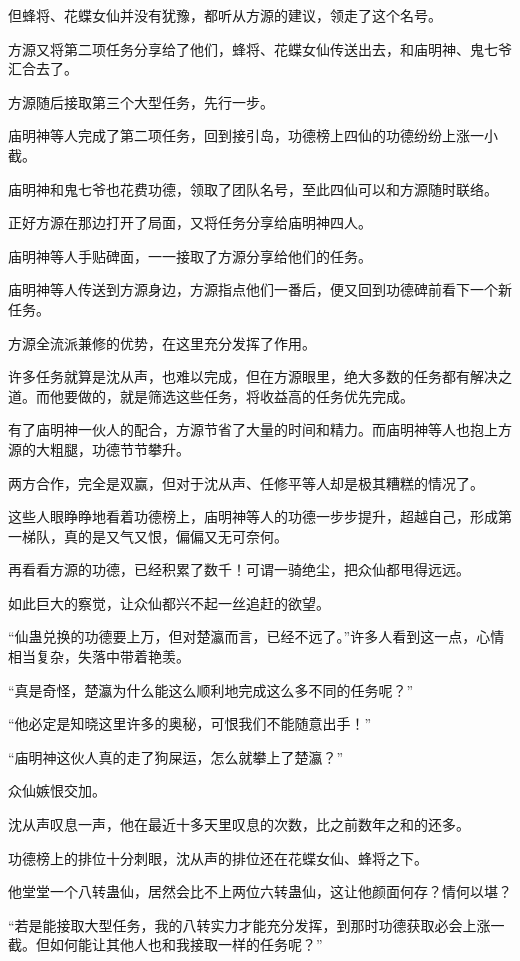 \begin{this_body}
但蜂将、花蝶女仙并没有犹豫，都听从方源的建议，领走了这个名号。

方源又将第二项任务分享给了他们，蜂将、花蝶女仙传送出去，和庙明神、鬼七爷汇合去了。

方源随后接取第三个大型任务，先行一步。

庙明神等人完成了第二项任务，回到接引岛，功德榜上四仙的功德纷纷上涨一小截。

庙明神和鬼七爷也花费功德，领取了团队名号，至此四仙可以和方源随时联络。

正好方源在那边打开了局面，又将任务分享给庙明神四人。

庙明神等人手贴碑面，一一接取了方源分享给他们的任务。

庙明神等人传送到方源身边，方源指点他们一番后，便又回到功德碑前看下一个新任务。

方源全流派兼修的优势，在这里充分发挥了作用。

许多任务就算是沈从声，也难以完成，但在方源眼里，绝大多数的任务都有解决之道。而他要做的，就是筛选这些任务，将收益高的任务优先完成。

有了庙明神一伙人的配合，方源节省了大量的时间和精力。而庙明神等人也抱上方源的大粗腿，功德节节攀升。

两方合作，完全是双赢，但对于沈从声、任修平等人却是极其糟糕的情况了。

这些人眼睁睁地看着功德榜上，庙明神等人的功德一步步提升，超越自己，形成第一梯队，真的是又气又恨，偏偏又无可奈何。

再看看方源的功德，已经积累了数千！可谓一骑绝尘，把众仙都甩得远远。

如此巨大的察觉，让众仙都兴不起一丝追赶的欲望。

“仙蛊兑换的功德要上万，但对楚瀛而言，已经不远了。”许多人看到这一点，心情相当复杂，失落中带着艳羡。

“真是奇怪，楚瀛为什么能这么顺利地完成这么多不同的任务呢？”

“他必定是知晓这里许多的奥秘，可恨我们不能随意出手！”

“庙明神这伙人真的走了狗屎运，怎么就攀上了楚瀛？”

众仙嫉恨交加。

沈从声叹息一声，他在最近十多天里叹息的次数，比之前数年之和的还多。

功德榜上的排位十分刺眼，沈从声的排位还在花蝶女仙、蜂将之下。

他堂堂一个八转蛊仙，居然会比不上两位六转蛊仙，这让他颜面何存？情何以堪？

“若是能接取大型任务，我的八转实力才能充分发挥，到那时功德获取必会上涨一截。但如何能让其他人也和我接取一样的任务呢？”


\end{this_body}
